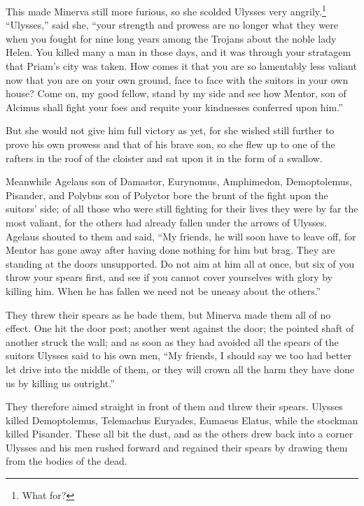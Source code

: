 This made Minerva still more furious, so she scolded Ulysses very angrily.\footnote{What for?} “Ulysses,”
said she, “your strength and prowess are no longer what they were when you
fought for nine long years among the Trojans about the noble lady Helen. You
killed many a man in those days, and it was through your stratagem that Priam’s
city was taken. How comes it that you are so lamentably less valiant now that
you are on your own ground, face to face with the suitors in your own house?
Come on, my good fellow, stand by my side and see how Mentor, son of Alcimus
shall fight your foes and requite your kindnesses conferred upon him.”

But she would not give him full victory as yet, for she wished still further to
prove his own prowess and that of his brave son, so she flew up to one of the
rafters in the roof of the cloister and sat upon it in the form of a swallow.

Meanwhile Agelaus son of Damastor, Eurynomus, Amphimedon, Demoptolemus,
Pisander, and Polybus son of Polyctor bore the brunt of the fight upon the
suitors’ side; of all those who were still fighting for their lives they were
by far the most valiant, for the others had already fallen under the arrows of
Ulysses. Agelaus shouted to them and said, “My friends, he will soon have to
leave off, for Mentor has gone away after having done nothing for him but brag.
They are standing at the doors unsupported. Do not aim at him all at once, but
six of you throw your spears first, and see if you cannot cover yourselves with
glory by killing him. When he has fallen we need not be uneasy about the
others.”

They threw their spears as he bade them, but Minerva made them all of no
effect. One hit the door post; another went against the door; the pointed shaft
of another struck the wall; and as soon as they had avoided all the spears of
the suitors Ulysses said to his own men, “My friends, I should say we too had
better let drive into the middle of them, or they will crown all the harm they
have done us by killing us outright.”

They therefore aimed straight in front of them and threw their spears. Ulysses
killed Demoptolemus, Telemachus Euryades, Eumaeus Elatus, while the stockman
killed Pisander. These all bit the dust, and as the others drew back into a
corner Ulysses and his men rushed forward and regained their spears by drawing
them from the bodies of the dead.

